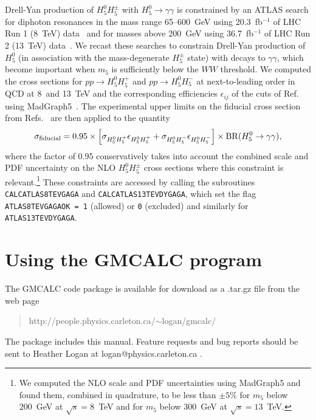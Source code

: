 \documentclass[11pt]{article}
\begin{document}
Drell-Yan production of $H_5^0 H_5^{\pm}$ with $H_5^0 \to \gamma\gamma$ is constrained by an ATLAS search for diphoton resonances in the mass range 65--600~GeV using 20.3~fb$^{-1}$ of LHC Run 1 (8~TeV) data~\cite{Aad:2014ioa} and for masses above 200~GeV using 36.7~fb$^{-1}$ of LHC Run 2 (13~TeV) data~\cite{Aaboud:2017yyg}.  We recast these searches to constrain Drell-Yan production of $H_5^0$ (in association with the mass-degenerate $H_5^{\pm}$ state) with decays to $\gamma\gamma$, which become important when $m_5$ is sufficiently below the $WW$ threshold.  We computed the cross sections for $pp \to H_5^0 H_5^+$ and $pp \to H_5^0 H_5^-$ at next-to-leading order in QCD at 8~and 13~TeV and the corresponding efficiencies $\epsilon_{ij}$ of the cuts of Ref.~\cite{Aad:2014ioa} using MadGraph5~\cite{Alwall:2014hca}.  The experimental upper limits on the fiducial cross section from Refs.~\cite{Aad:2014ioa,Aaboud:2017yyg} are then applied to the quantity
\begin{equation}
	\sigma_{\rm fiducial} = 0.95 \times \left[ \sigma_{H_5^0 H_5^+} \epsilon_{H_5^0 H_5^+} 
		+ \sigma_{H_5^0 H_5^-} \epsilon_{H_5^0 H_5^-} \right] 
		\times {\rm BR}(H_5^0 \to \gamma\gamma),
\end{equation}
where the factor of 0.95 conservatively takes into account the combined scale and PDF uncertainty on the NLO $H_5^0 H_5^{\pm}$ cross sections where this constraint is relevant.\footnote{We computed the NLO scale and PDF uncertainties using MadGraph5 and found them, combined in quadrature, to be less than $\pm 5\%$ for $m_5$ below 200~GeV at $\sqrt{s} = 8$~TeV and for $m_5$ below 300~GeV at $\sqrt{s} = 13$~TeV.}
These constraints are accessed by calling the subroutines {\tt CALCATLAS8TEVGAGA} and {\tt CALCATLAS13TEVDYGAGA}, which set the flag {\tt ATLAS8TEVGAGAOK = 1} (allowed) or {\tt 0} (excluded) and similarly for {\tt ATLAS13TEVDYGAGA}.


\section{Using the GMCALC program}
\label{sec:using}

The GMCALC code package is available for download as a .tar.gz file from the web page
\begin{quote}
	http://people.physics.carleton.ca/$\sim$logan/gmcalc/
\end{quote}
The package includes this manual.  Feature requests and bug reports should be sent to Heather Logan at logan@physics.carleton.ca .
\end{document}
